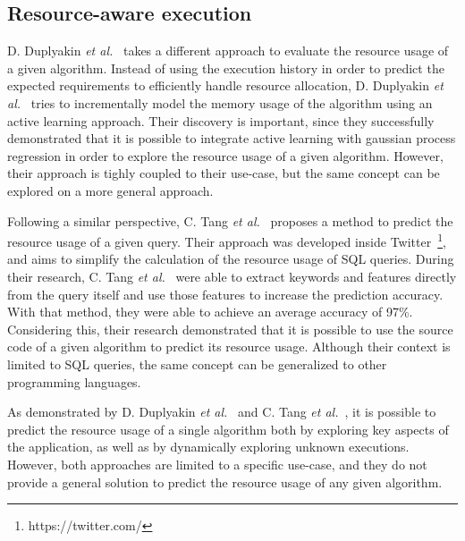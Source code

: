 \subsection{Resource-aware execution}
\label{subsec:resource-aware-execution}

D. Duplyakin \emph{et al.}~\cite{duplyakin2018} takes a different approach to evaluate the resource usage of a given algorithm.
Instead of using the execution history in order to predict the expected requirements to efficiently handle resource allocation, D. Duplyakin \emph{et al.}~\cite{duplyakin2018} tries to incrementally model the memory usage of the algorithm using an active learning approach.
Their discovery is important, since they successfully demonstrated that it is possible to integrate active learning with gaussian process regression in order to explore the resource usage of a given algorithm.
However, their approach is tighly coupled to their use-case, but the same concept can be explored on a more general approach.

Following a similar perspective, C. Tang \emph{et al.}~\cite{tang2021} proposes a method to predict the resource usage of a given query.
Their approach was developed inside Twitter~\footnote{https://twitter.com/}, and aims to simplify the calculation of the resource usage of SQL queries.
During their research, C. Tang \emph{et al.}~\cite{tang2021} were able to extract keywords and features directly from the query itself and use those features to increase the prediction accuracy.
With that method, they were able to achieve an average accuracy of 97\%.
Considering this, their research demonstrated that it is possible to use the source code of a given algorithm to predict its resource usage.
Although their context is limited to SQL queries, the same concept can be generalized to other programming languages.

As demonstrated by D. Duplyakin \emph{et al.}~\cite{duplyakin2018} and C. Tang \emph{et al.}~\cite{tang2021}, it is possible to predict the resource usage of a single algorithm both by exploring key aspects of the application, as well as by dynamically exploring unknown executions.
However, both approaches are limited to a specific use-case, and they do not provide a general solution to predict the resource usage of any given algorithm.
